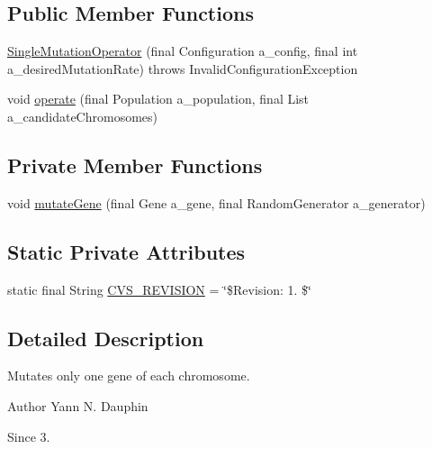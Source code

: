 \subsection*{Public Member Functions}
\begin{DoxyCompactItemize}
\item 
\hyperlink{classexamples_1_1monalisa_1_1core_1_1_single_mutation_operator_a86d6b9504b4acd8a6fd5663e3a4c3b06}{Single\-Mutation\-Operator} (final Configuration a\-\_\-config, final int a\-\_\-desired\-Mutation\-Rate)  throws Invalid\-Configuration\-Exception 
\item 
void \hyperlink{classexamples_1_1monalisa_1_1core_1_1_single_mutation_operator_a07db0eb33cb05fa3407e1b560e0a7a9a}{operate} (final Population a\-\_\-population, final List a\-\_\-candidate\-Chromosomes)
\end{DoxyCompactItemize}
\subsection*{Private Member Functions}
\begin{DoxyCompactItemize}
\item 
void \hyperlink{classexamples_1_1monalisa_1_1core_1_1_single_mutation_operator_a38114483ed823bbcbcb3340610b4d83d}{mutate\-Gene} (final Gene a\-\_\-gene, final Random\-Generator a\-\_\-generator)
\end{DoxyCompactItemize}
\subsection*{Static Private Attributes}
\begin{DoxyCompactItemize}
\item 
static final String \hyperlink{classexamples_1_1monalisa_1_1core_1_1_single_mutation_operator_a37b7a3e5ba8363d445353068b28ef85b}{C\-V\-S\-\_\-\-R\-E\-V\-I\-S\-I\-O\-N} = \char`\"{}\$Revision\-: 1. \$\char`\"{}
\end{DoxyCompactItemize}


\subsection{Detailed Description}
Mutates only one gene of each chromosome.

\begin{DoxyAuthor}{Author}
Yann N. Dauphin 
\end{DoxyAuthor}
\begin{DoxySince}{Since}
3. 
\end{DoxySince}


